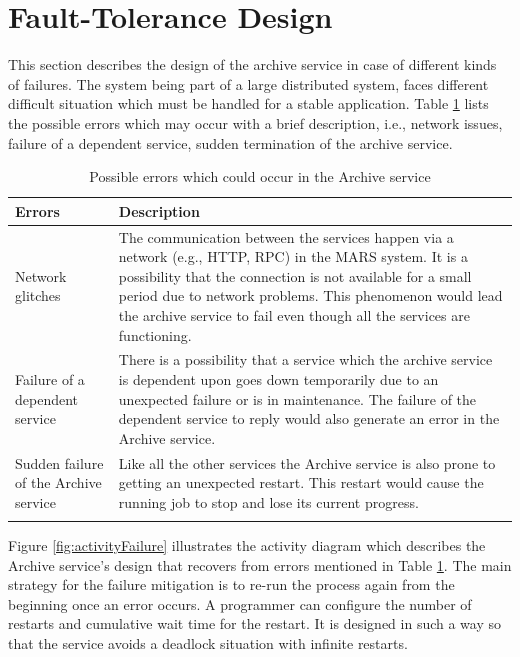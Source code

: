 \newpage
\section{Fault-Tolerance Design}
\label{sec:ftDesign}
This section describes the design of the archive service in case of different kinds of failures. The system being part of a large distributed system,
faces different difficult situation which must be handled for a stable application. Table \ref{table:probServices} lists the possible errors which 
may occur with a brief description, i.e., network issues, failure of a 
dependent service, sudden termination of the archive service. 
\begin{longtable}{|p{4cm}|p{10cm}|}
    \hline
        \textbf{Errors}  & \textbf{Description}\\
    \hline
        Network glitches & The communication between the services
        happen via a network (e.g., HTTP, RPC) in the MARS system. It is a possibility that the connection is not available for a small period due to network problems.
        This phenomenon would lead the archive service to fail even though all the services are functioning.\\
    \hline
        Failure of a dependent service & There is a possibility that a service which the archive service is dependent upon goes down temporarily due to an unexpected
        failure or is in maintenance. The failure of the dependent service to reply would also generate an error in the Archive service.\\
    \hline
        Sudden failure of the Archive service & Like all the other services the Archive service is also prone to getting an unexpected restart. 
        This restart would cause the running job to stop and lose its current progress.\\    
    \hline
    \caption{Possible errors which could occur in the Archive service}
    \label{table:probServices} 
\end{longtable}

Figure \ref{fig:activityFailure} illustrates the activity diagram which describes the Archive service's design that recovers from errors mentioned in
Table \ref{table:probServices}. The main strategy for the failure mitigation is to re-run the process again from the beginning once an error occurs. 
A programmer can configure the number of restarts and cumulative wait time for the restart. It is designed in such a way so that the service avoids a deadlock situation with infinite restarts.


